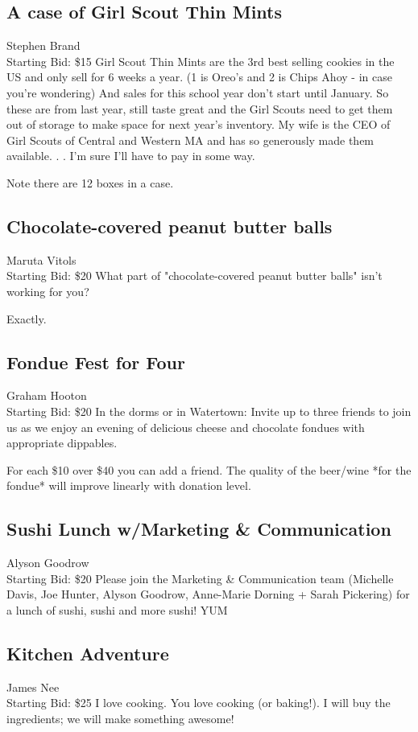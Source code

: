 \documentclass[11pt]{article}
\begin{document}
\subsection{A case of Girl Scout Thin Mints}
Stephen Brand
\\
Starting Bid: \$15
\newline
Girl Scout Thin Mints are the 3rd best selling cookies in the US and only sell for 6 weeks a year. (1 is Oreo's and 2 is Chips Ahoy - in case you're wondering) And sales for this school year don't start until January.  So these are from last year, still taste great and the Girl Scouts need to get them out of storage to make space for next year's inventory.  My wife is the CEO of Girl Scouts of Central and Western MA and has so generously made them available. . . I'm sure I'll have to pay in some way.  

Note there are 12 boxes in a case.
\subsection{Chocolate-covered peanut butter balls}
Maruta Vitols
\\
Starting Bid: \$20
\newline
What part of "chocolate-covered peanut butter balls" isn't working for you?

Exactly.
\subsection{Fondue Fest for Four}
Graham Hooton
\\
Starting Bid: \$20
\newline
In the dorms or in Watertown: Invite up to three friends to join us as we enjoy an evening of delicious cheese and chocolate fondues with appropriate dippables.

For each \$10 over \$40 you can add a friend.
The quality of the beer/wine *for the fondue* will improve linearly with donation level.
\subsection{Sushi Lunch w/Marketing \& Communication}
Alyson Goodrow
\\
Starting Bid: \$20
\newline
Please join the Marketing \& Communication team (Michelle Davis, Joe Hunter, Alyson Goodrow, Anne-Marie Dorning + Sarah Pickering) for a lunch of sushi, sushi and more sushi! YUM
\subsection{Kitchen Adventure}
James Nee
\\
Starting Bid: \$25
\newline
I love cooking. You love cooking (or baking!). I will buy the ingredients; we will make something awesome!
\end{document}
